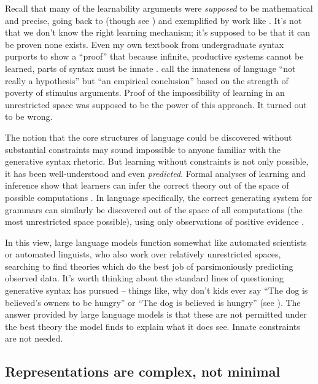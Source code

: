 \documentclass[output=paper,colorlinks,citecolor=brown]{langscibook}
\begin{document}
Recall that many of the learnability arguments were \textit{supposed} to be mathematical and precise, going back to \citet{gold1967language} (though see \citealt{johnson2004gold,chater2007ideal}) and exemplified by work like . It's not that we don't know the right learning mechanism; it's supposed to be that it can be proven none exists. Even my own textbook from undergraduate syntax purports to show a ``proof'' that because infinite, productive systems cannot be learned, parts of syntax must be innate \citep{carnie2021syntax}. \citet{legate2002empirical} call the innateness of language ``not really a hypothesis'' but ``an empirical conclusion'' based on the strength of poverty of stimulus arguments. Proof of the impossibility of learning in an unrestricted space was supposed to be the power of this approach. It turned out to be wrong.

The notion that the core structures of language could be discovered without substantial constraints may sound impossible to anyone familiar with the generative syntax rhetoric. But learning without constraints is not only possible, it has been well-understood and even \textit{predicted}. Formal analyses of learning and inference show that learners can infer the correct theory out of the space of possible computations \citep{solomonoff1964formal,hutter2004universal,legg2007universal}. In language specifically, the correct generating system for grammars can similarly be discovered out of the space of all computations (the most unrestricted space possible), using only observations of positive evidence \citep{chater2007ideal}.

In this view, large language models function somewhat like automated scientists or automated linguists, who also work over relatively unrestricted spaces, searching to find theories which do the best job of parsimoniously predicting observed data. It's worth thinking about the standard lines of questioning generative syntax has pursued -- things like, why don't kids ever say ``The dog is believed's owners to be hungry'' or ``The dog is believed is hungry'' (see \citealt{lasnik2016argument}). The answer provided by large language models is that these are not permitted under the best theory the model finds to explain what it does see. Innate constraints are not needed.

\subsection{Representations are complex, not minimal}
\end{document}

